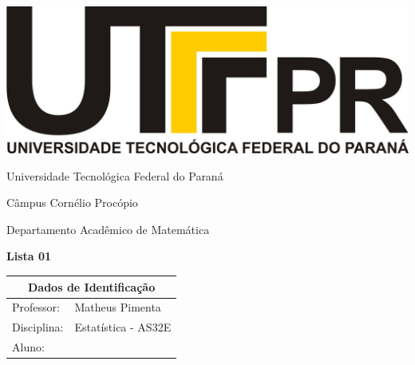 \documentclass[oneside,a4paper,12pt]{article}
\newcommand{\universidade}{Universidade Tecnológica Federal do Paraná}
\newcommand{\centro}{Câmpus Cornélio Procópio}
\newcommand{\departamento}{Departamento Acadêmico de Matemática}
\newcommand{\curso}{Análise e Desenvolvimento de Sistemas}
\newcommand{\professores}{Matheus Pimenta}
\newcommand{\disciplina}{Estatística - AS32E}
\begin{document}
	\pagestyle{empty}
	
	\begin{center}
		\includegraphics[width=\linewidth/8]{logo.jpg}%
	 	\vspace{2pt} 	
		
		\universidade
		\par
		\centro
		\par
		\departamento
		\par
		\par
		\vspace{12pt}
		\LARGE \textbf{Lista 01}
		
	\end{center}
	
	\vspace{12pt}
	
	\begin{tabular}{ |l|p{12cm}| }
		
		\hline
		\multicolumn{2}{|c|}{\textbf{Dados de Identificação}} \\
		\hline
		Professor:         &    \professores           \\
		\hline
		Disciplina:        &    \disciplina          \\
		\hline
		Aluno:             &                   \\
		\hline
		
	\end{tabular}
	\vspace{6pt}
	
	
	\begin{snugshade}
	\end{snugshade}
\end{document}
